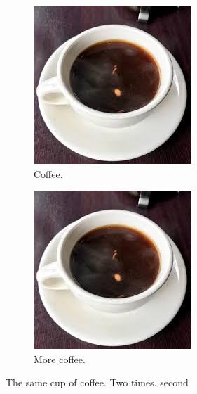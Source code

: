 \documentclass{article}
\begin{document}
\begin{figure}[h!]
  \begin{subfigure}[b]{0.4\linewidth}
    \includegraphics[width=\linewidth]{coffee.jpg}
    \caption{Coffee.}
  \end{subfigure}
  \begin{subfigure}[b]{0.4\linewidth}
    \includegraphics[width=\linewidth]{coffee.jpg}
    \caption{More coffee.}
  \end{subfigure}
  \caption{The same cup of coffee. Two times. second}
  \label{fig:coffee2}

\end{figure}


\begin{appendix}
  \listoffigures
  \listoftables
\end{appendix}
\end{document}
